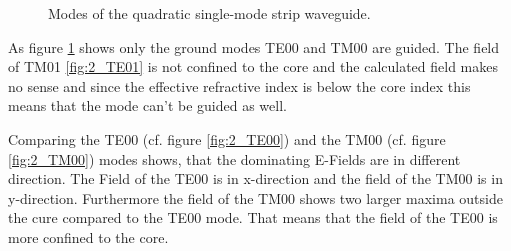 \begin{figure}[ht]
\caption{Modes of the quadratic single-mode strip waveguide.}%
\label{fig:2_modes}%
\end{figure}
As figure \ref{fig:2_modes} shows only the ground modes TE00 and TM00 are guided. The field of TM01 \ref{fig:2_TE01} is not confined to the core and the calculated field makes no sense and since the effective refractive index is below the core index this means that the mode can't be guided as well.

Comparing the TE00 (cf. figure \ref{fig:2_TE00}) and the TM00 (cf. figure \ref{fig:2_TM00}) modes shows, that the dominating E-Fields are in different direction. The Field of the TE00 is in x-direction and the field of the TM00 is in y-direction. Furthermore the field of the TM00 shows two larger maxima outside the cure compared to the TE00 mode. That means that the field of the TE00 is more confined to the core.

